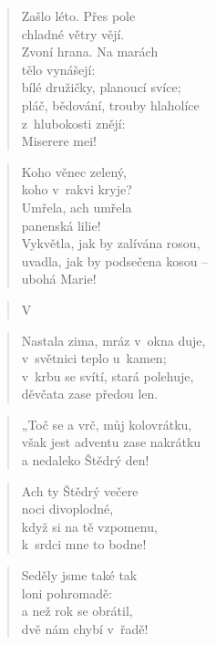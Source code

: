 \begin{verse}
Zašlo léto. Přes pole \\
chladné větry vějí. \\
Zvoní hrana. Na marách \\
tělo vynášejí: \\
bílé družičky, planoucí svíce; \\
pláč, bědování, trouby hlaholíce \\
z~hlubokosti znějí: \\
Miserere mei!
\end{verse}

\begin{verse}
Koho věnec zelený, \\
koho v~rakvi kryje? \\
Umřela, ach umřela \\
panenská lilie! \\
Vykvětla, jak by zalívána rosou, \\
uvadla, jak by podsečena kosou -- \\
ubohá Marie!
\end{verse}

\begin{verse}
V~\end{verse}

\begin{verse}
Nastala zima, mráz v~okna duje, \\
v~světnici teplo u~kamen; \\
v~krbu se svítí, stará polehuje, \\
děvčata zase předou len.
\end{verse}

\begin{verse}
„Toč se a vrč, můj kolovrátku, \\
však jest adventu zase nakrátku \\
a nedaleko Štědrý den!
\end{verse}

\begin{verse}
Ach ty Štědrý večere \\
noci divoplodné, \\
když si na tě vzpomenu, \\
k~srdci mne to bodne!
\end{verse}

\begin{verse}
Seděly jsme také tak \\
loni pohromadě: \\
a než rok se obrátil, \\
dvě nám chybí v~řadě!
\end{verse}


